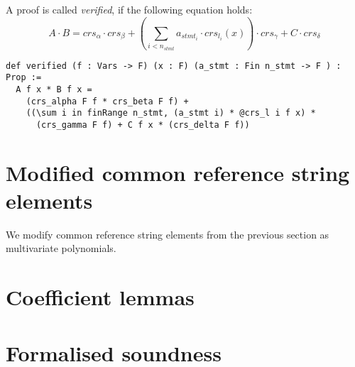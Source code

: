 \documentclass{article}
\theoremstyle{definition}
\theoremstyle{remark}
\begin{document}
A proof is called \emph{verified}, if the following equation holds:
\begin{equation}
A \cdot B = crs_{\alpha} \cdot crs_{\beta} + (\sum \limits_{i < n_{stmt}} a_{{stmt}_i} \cdot crs_{l_i}(x)) \cdot crs_{\gamma} + C \cdot crs_{\delta}
\end{equation}

\begin{lstlisting}
def verified (f : Vars -> F) (x : F) (a_stmt : Fin n_stmt -> F ) : Prop :=
  A f x * B f x =
    (crs_alpha F f * crs_beta F f) +
    ((\sum i in finRange n_stmt, (a_stmt i) * @crs_l i f x) *
      (crs_gamma F f) + C f x * (crs_delta F f))
\end{lstlisting}

\section{Modified common reference string elements}

We modify common reference string elements from the previous section as multivariate polynomials.

\section{Coefficient lemmas}

\section{Formalised soundness}



\end{document}
